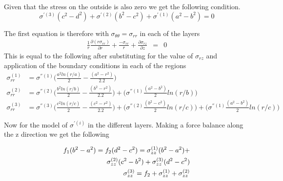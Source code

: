 \documentclass[11pt]{article} %
\makeatletter
\def \beg {\begin{equation}}
\def \en {\end{equation}}
\def\ece#1#2{
	\expandafter#1\csname#2\endcsname
}%
\def\setproperty#1#2#3{%
	\ece \edef{#1@p#2}{#3}
}%
\def\getproperty#1#2{%
  \expandafter\ifx\csname#1@p#2\endcsname\relax
  \else \csname#1@p#2\endcsname
  \fi
}%
\makeatother
\begin{document}
	Given that the stress on the outside is also zero we get the following condition.
	\beg
		\boxed {
			\sigma^{'(3)}({c}^{2} - {d}^{2})  + \sigma^{'(2)}({b}^{2} - {c}^{2})  +  \sigma^{'(1)}({a}^{2} - {b}^{2})  = 0
		}
	\en

%
%

	The first equation is therefore with $\sigma_{\theta\theta} = \sigma_{rr}$ in each of the layers
	\beg
		\begin{aligned}
			\frac{1}{r}\frac{\partial(r\sigma_{rr})}{\partial r} + \frac {- \sigma_{rr}}{r} +   
					\frac{\partial \sigma_{rz}}{\partial z}  & =  &  0 
		\end{aligned}
	\en
	This is equal to the following after substituting for the value of  $\sigma_{rz} $ and application of the boundary conditions in each of the regions 
	\beg		
		\boxed{
			\begin{aligned}
				\sigma_{rr}^{(1)} & = \sigma^{''(1)}\Bigg({\frac {a^{2} ln{(r/a)}}{2} - \frac{(a^2 - r^2)}{2.2} } \Bigg)\\
%					
				\sigma_{rr}^{(2)} & = \sigma^{''(2)}\Bigg({\frac {b^{2} ln{(r/b)}}{2} - \frac{(b^2 - r^2)}{2.2} } \Bigg) + 		\Bigg(\sigma^{''(1)}\frac{(a^{2} -b^{2})}{2} ln(r/b) \Bigg)\\ 
%					
				\sigma_{rr}^{(3)} & = \sigma^{''(3)}\Bigg({\frac {c^{2} ln{(r/c)}}{2} - \frac{(c^2 - r^2)}{2.2} } \Bigg)  + 		\Bigg(\sigma^{''(2)}\frac{(b^{2} -c^{2})}{2} ln(r/c) \Bigg) +\Bigg(\sigma^{''(1)}\frac{(a^{2} -b^{2})}{2} ln(r/c) \Bigg)   
			\end{aligned}	
		}
	\en

	Now for the model of $\sigma^{'(i)} $ in the different layers.
	Making a force balance along the z direction we get the following

	

	\beg
		\begin{aligned}
			f_1(b^{2} - a^{2}) = f_2(d^{2} - c^{2}) = \sigma_{zz}^{(1)}(b^{2} - a^{2}) +  \\
				\sigma_{zz}^{(2)}(c^{2} - b^{2}) + \sigma_{zz}^{(3)}(d^2 - c^2) \\
			\sigma_{zz}^{(3)} = f_2 + \sigma_{zz}^{(1)}\getproperty{sigma_coeff}{v1} + \sigma_{zz}^{(2)} \getproperty{sigma_coeff}{v2}					 
		\end{aligned}		
	\en
\end{document}

